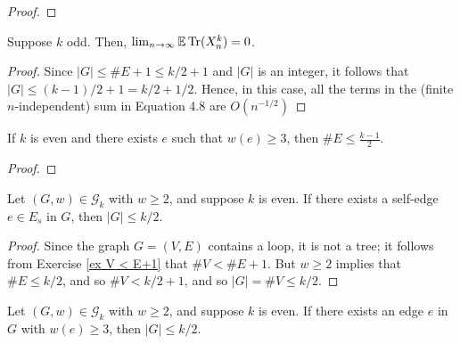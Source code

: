\begin{proof}
  \notready
\end{proof}




\begin{proposition}
  \label{prop:odd_case}
  \notready
  Suppose $k$ odd. Then, $\lim_{n\to\infty} {\mathbb{E}}\operatorname{Tr}(X_n^k) = 0$.
\end{proposition}

\begin{proof}
  \notready
  Since $|G|\le \#E+1 \le k/2+1$ and $|G|$ is an integer, it follows that $|G|\le (k-1)/2+1 = k/2 + 1/2$.  Hence, in this case, all the terms in the (finite $n$-independent) sum in Equation 4.8 are $O(n^{-1/2})$
\end{proof}

\begin{lemma}
  \label{lemma:edge_bound_large_w}
  \notready
  If $k$ is even and there exists $e$ such that $w(e) \ge 3$, then $\#E \le \frac{k-1}{2}$.
\end{lemma}

\begin{proof}
  \notready
\end{proof}



\begin{proposition}%
  \label{prop:g_bound_self_edge}
  \notready
  Let $(G,w)\in\mathcal{G}_k$ with $w\ge 2$, and suppose $k$ is even. If there exists a self-edge $e\in E_s$ in $G$, then $|G|\le k/2$.
\end{proposition}

\begin{proof}
  \notready
  Since the graph $G = (V,E)$ contains a loop, it is not a tree; it follows from Exercise \ref{ex V < E+1} that $\#V < \#E+1$.  But $w\ge 2$ implies that $\#E\le k/2$, and so $\#V < k/2+1$, and so $|G| = \#V \le k/2$.
\end{proof}

\begin{proposition}%
  \label{prop:g_bound_large_w}
  \notready
  Let $(G,w)\in\mathcal{G}_k$ with $w\ge 2$, and suppose $k$ is even. If there exists an edge $e$ in $G$ with $w(e)\ge 3$, then $|G|\le k/2$.
\end{proposition}

